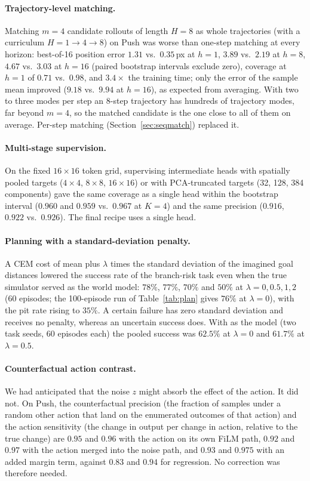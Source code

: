 \paragraph{Trajectory-level matching.}
Matching $m{=}4$ candidate rollouts of length $H{=}8$ as whole trajectories (with a curriculum $H = 1 \to 4 \to 8$) on Push was worse than one-step matching at every horizon: best-of-16 position error $1.31$ vs.\ $0.35$\,px at $h{=}1$, $3.89$ vs.\ $2.19$ at $h{=}8$, $4.67$ vs.\ $3.03$ at $h{=}16$ (paired bootstrap intervals exclude zero), coverage at $h{=}1$ of $0.71$ vs.\ $0.98$, and $3.4\times$ the training time; only the error of the sample mean improved ($9.18$ vs.\ $9.94$ at $h{=}16$), as expected from averaging. With two to three modes per step an 8-step trajectory has hundreds of trajectory modes, far beyond $m{=}4$, so the matched candidate is the one close to all of them on average. Per-step matching (Section~\ref{sec:seqmatch}) replaced it.

\paragraph{Multi-stage supervision.}
On the fixed $16\times16$ token grid, supervising intermediate heads with spatially pooled targets ($4\times4$, $8\times8$, $16\times16$) or with PCA-truncated targets (32, 128, 384 components) gave the same coverage as a single head within the bootstrap interval ($0.960$ and $0.959$ vs.\ $0.967$ at $K{=}4$) and the same precision ($0.916$, $0.922$ vs.\ $0.926$). The final recipe uses a single head.

\paragraph{Planning with a standard-deviation penalty.}
A CEM cost of mean plus $\lambda$ times the standard deviation of the imagined goal distances lowered the success rate of the branch-risk task even when the true simulator served as the world model: $78\%$, $77\%$, $70\%$ and $50\%$ at $\lambda = 0, 0.5, 1, 2$ (60 episodes; the 100-episode run of Table~\ref{tab:plan} gives $76\%$ at $\lambda = 0$), with the pit rate rising to $35\%$. A certain failure has zero standard deviation and receives no penalty, whereas an uncertain success does. With \imlewm{} as the model (two task seeds, 60 episodes each) the pooled success was $62.5\%$ at $\lambda = 0$ and $61.7\%$ at $\lambda = 0.5$.

\paragraph{Counterfactual action contrast.}
We had anticipated that the noise $z$ might absorb the effect of the action. It did not. On Push, the counterfactual precision (the fraction of samples under a random other action that land on the enumerated outcomes of that action) and the action sensitivity (the change in output per change in action, relative to the true change) are $0.95$ and $0.96$ with the action on its own FiLM path, $0.92$ and $0.97$ with the action merged into the noise path, and $0.93$ and $0.975$ with an added margin term, against $0.83$ and $0.94$ for regression. No correction was therefore needed.

